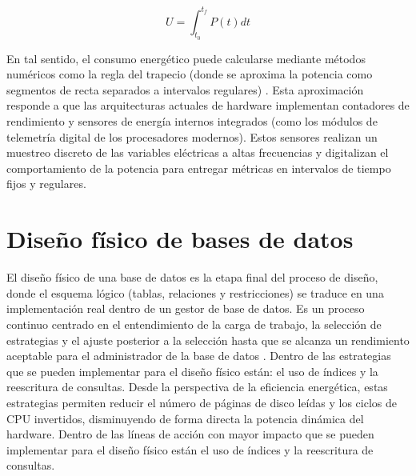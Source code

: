 \documentclass[12pt, letter paper]{report}
\begin{document}
        \begin{equation}
          U = \int_{t_0}^{t_f} P(t) dt
          \label{eq:consumo}
        \end{equation}

        En tal sentido, el consumo energético puede calcularse mediante métodos
        numéricos como la regla del trapecio (donde se aproxima la potencia
        como segmentos de recta separados a intervalos regulares)
        \cite{burden2010numerical}. Esta aproximación responde a que las
        arquitecturas actuales de hardware implementan contadores de rendimiento
        y sensores de energía  internos integrados (como los módulos de
        telemetría digital de los procesadores modernos). Estos sensores
        realizan un muestreo discreto de las  variables eléctricas a altas
        frecuencias y digitalizan el comportamiento de la potencia para entregar
        métricas en intervalos de tiempo fijos y regulares.

    \section{Diseño físico de bases de datos} %
    \label{sec:diseño_físico_de_bases_de_datos}
      El diseño físico de una base de datos es la etapa final
      \cite{connolly2014database} del proceso de diseño, donde el esquema lógico
      (tablas, relaciones y restricciones) se traduce en una implementación real
      \cite{silberschatz2019database, elmasri2016fundamentals,
      connolly2014database} dentro de un gestor de base de datos. Es un
      proceso continuo centrado en el entendimiento de la carga de trabajo, la
      selección de estrategias y el ajuste posterior a la selección hasta que
      se alcanza un rendimiento aceptable para el administrador de la base de
      datos \cite{ramakrishnan2003database}. Dentro de las estrategias que se
      pueden implementar para el diseño físico están: el uso de índices y la
      reescritura de consultas. Desde la perspectiva de la eficiencia
      energética, estas estrategias permiten reducir el número de páginas de
      disco leídas y los ciclos de CPU invertidos, disminuyendo de forma directa
      la potencia dinámica del hardware. Dentro de las líneas de acción con
      mayor impacto que se pueden implementar para el diseño físico están el uso
      de índices y la reescritura de consultas.
\end{document}
